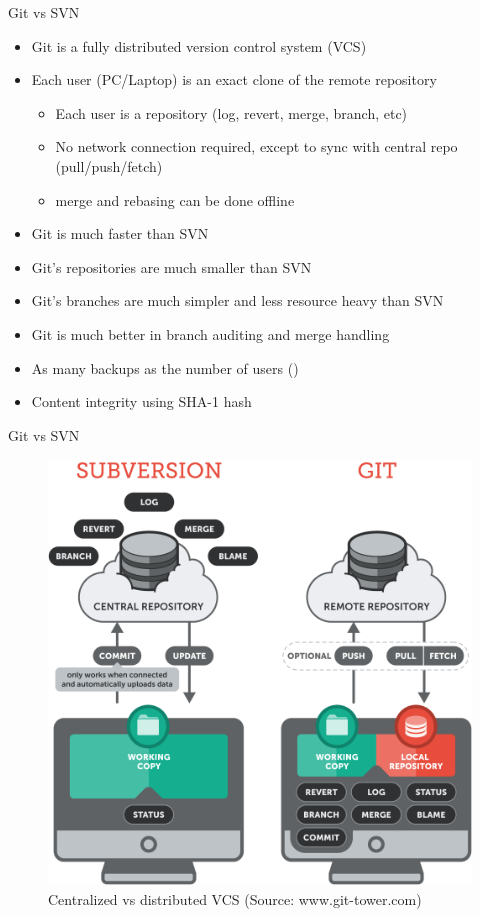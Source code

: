 \begin{frame}{Git vs SVN}
\begin{itemize}
  \item Git is a fully distributed version control system (VCS)
  \item Each user (PC/Laptop) is an exact clone of the remote repository
    \begin{itemize}
      \item Each user is a repository (log, revert, merge, branch, etc)
      \item No network connection required, except to sync with central repo (pull/push/fetch)
      \item merge and rebasing can be done offline
    \end{itemize}
  \item Git is much faster than SVN
  \item Git's repositories are much smaller than SVN
  \item Git's branches are much simpler and less resource heavy than SVN
  \item Git is much better in branch auditing and merge handling
  \item As many backups as the number of users ()
  \item Content integrity using SHA-1 hash
  \end{itemize}
\end{frame}

\begin{frame}{Git vs SVN}
  \begin{figure}
    \begin{center}
    \includegraphics[width=0.5\linewidth]{pics/git-vs-svn.png}
    \vspace{-0.3cm}
    \caption{\footnotesize Centralized vs distributed VCS (Source: www.git-tower.com)}
  \end{center}
\end{figure}
\end{frame}

